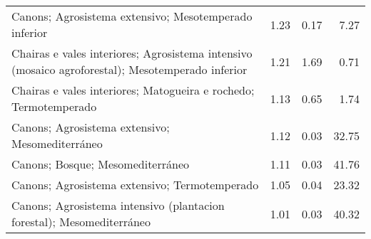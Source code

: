 \begin{table}[p]
\begin{tabular}{lrrr}
  Canons; Agrosistema extensivo; Mesotemperado inferior & 1.23 & 0.17 & 7.27 \\ 
  Chairas e vales interiores; Agrosistema intensivo (mosaico agroforestal); Mesotemperado inferior & 1.21 & 1.69 & 0.71 \\ 
  Chairas e vales interiores; Matogueira e rochedo; Termotemperado & 1.13 & 0.65 & 1.74 \\ 
  Canons; Agrosistema extensivo; Mesomediterráneo & 1.12 & 0.03 & 32.75 \\ 
  Canons; Bosque; Mesomediterráneo & 1.11 & 0.03 & 41.76 \\ 
  Canons; Agrosistema extensivo; Termotemperado & 1.05 & 0.04 & 23.32 \\ 
  Canons; Agrosistema intensivo (plantacion forestal); Mesomediterráneo & 1.01 & 0.03 & 40.32 \\ 
   \hline
\end{tabular}
\end{table}

